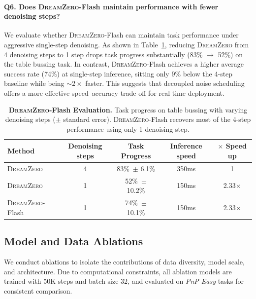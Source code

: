 \documentclass[10pt,logo,copyright]{nvidiatechreport}
\newcommand{\ourmethod}{\mbox{\textsc{DreamZero}}\xspace}
\begin{document}
\paragraph{Q6. Does \ourmethod-Flash maintain performance with fewer denoising steps?}

We evaluate whether \ourmethod-Flash can maintain task performance under aggressive single-step denoising. As shown in Table~\ref{tab:tidying_one_step}, reducing \ourmethod from 4 denoising steps to 1 step drops task progress substantially (83\% $\rightarrow$ 52\%) on the table bussing task. In contrast, \ourmethod-Flash achieves a higher average success rate (74\%) at single-step inference, sitting only 9\% below the 4-step baseline while being ${\sim}2\times$ faster. This suggests that decoupled noise scheduling offers a more effective speed–accuracy trade-off for real-time deployment.

\begin{table}[H]
\small
\centering
\begin{tabular}{lcccc}
\arrayrulecolor{nvidiagreen} 
\toprule
\textbf{Method} & \textbf{Denoising steps}  & \textbf{Task Progress} & \textbf{Inference speed} & \textbf{$\times$ Speed up}\\
\midrule
\ourmethod       & 4 & 83\% \,\scriptsize{$\pm$ 6.1\%} & 350ms & 1\\ 
\ourmethod       & 1 & 52\% \,\scriptsize{$\pm$ 10.2\%} & 150ms & 2.33$\times$\\
\ourmethod-Flash & 1 & 74\% \,\scriptsize{$\pm$ 10.1\%} & 150ms & 2.33$\times$\\
\bottomrule
\end{tabular}
\caption{\textbf{\ourmethod-Flash Evaluation.} Task progress on table bussing with varying denoising steps ($\pm$ standard error). \ourmethod-Flash recovers most of the 4-step performance using only 1 denoising step.}
\label{tab:tidying_one_step}
\end{table}


\subsection{Model and Data Ablations}
\label{subsec:ablations}

We conduct ablations to isolate the contributions of data diversity, model scale, and architecture. Due to computational constraints, all ablation models are trained with 50K steps and batch size 32, and evaluated on \textit{PnP Easy} tasks for consistent comparison.
\end{document}
